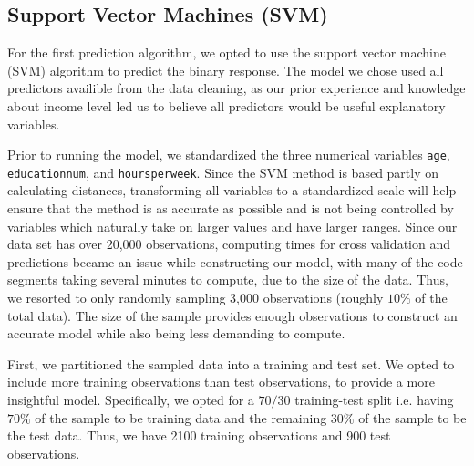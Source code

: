 \documentclass{article}
\begin{document}
    \subsection{Support Vector Machines (SVM)}   

    For the first prediction algorithm, we opted to use the support vector machine (SVM) algorithm to predict the binary response. The model we chose used all predictors availible from the data cleaning, as our prior experience and knowledge about income level led us to believe all predictors would be useful explanatory variables. 
    
    Prior to running the model, we standardized the three numerical variables \texttt{age}, \texttt{educationnum}, and \texttt{hoursperweek}. Since the SVM method is based partly on calculating distances, transforming all variables to a standardized scale will help ensure that the method is as accurate as possible and is not being controlled by variables which naturally take on larger values and have larger ranges. Since our data set has over 20,000 observations, computing times for cross validation and predictions became an issue while constructing our model, with many of the code segments taking several minutes to compute, due to the size of the data. Thus, we resorted to only randomly sampling 3,000 observations (roughly $10\%$ of the total data). The size of the sample provides enough observations to construct an accurate model while also being less demanding to compute.  \par 
    
    First, we partitioned the sampled data into a training and test set. We opted to include more training observations than test observations, to provide a more insightful model. Specifically, we opted for a $70/30$ training-test split i.e. having $70\%$ of the sample to be training data and the remaining $30\%$ of the sample to be the test data. Thus, we have 2100 training observations and 900 test observations. \par 
    
\end{document}
